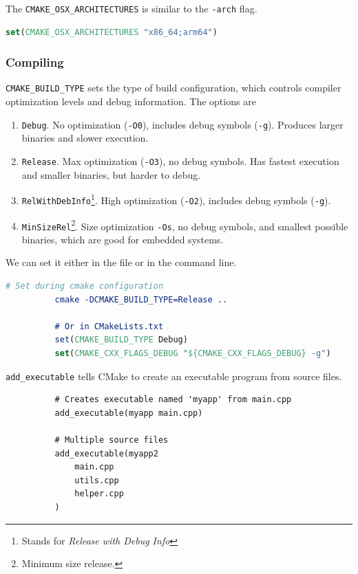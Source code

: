 \documentclass{article}
\newcounter{definition}[section]
\begin{document}
      \begin{definition}[Architecture]
        \label{def:architecture}
        The \texttt{CMAKE\_OSX\_ARCHITECTURES} is similar to the \texttt{-arch} flag. 
        \begin{lstlisting}[language=CMake]
          set(CMAKE_OSX_ARCHITECTURES "x86_64;arm64")
        \end{lstlisting}
      \end{definition} 

    \subsubsection{Compiling}

      \begin{definition}
        \label{def:build-type}
        \texttt{CMAKE\_BUILD\_TYPE} sets the type of build configuration, which controls compiler optimization levels and debug information. The options are 
        \begin{enumerate}
          \item \texttt{Debug}. No optimization (\texttt{-O0}), includes debug symbols (\texttt{-g}). Produces larger binaries and slower execution. 
          \item \texttt{Release}. Max optimization (\texttt{-O3}), no debug symbols. Has fastest execution and smaller binaries, but harder to debug. 
          \item \texttt{RelWithDebInfo}\footnote{Stands for \textit{Release with Debug Info}}. High optimization (\texttt{-O2}), includes debug symbols (\texttt{-g}).  
          \item \texttt{MinSizeRel}\footnote{Minimum size release.}. Size optimization \texttt{-Os}, no debug symbols, and smallest possible binaries, which are good for embedded systems. 
        \end{enumerate}
        We can set it either in the file or in the command line. 
        \begin{lstlisting}[language=CMake]
          # Set during cmake configuration
          cmake -DCMAKE_BUILD_TYPE=Release ..

          # Or in CMakeLists.txt 
          set(CMAKE_BUILD_TYPE Debug)
          set(CMAKE_CXX_FLAGS_DEBUG "${CMAKE_CXX_FLAGS_DEBUG} -g")
        \end{lstlisting}
      \end{definition} 

      \begin{definition}
        \label{def:add-executable}
        \texttt{add\_executable} tells CMake to create an executable program from source files. 
        \begin{lstlisting}
          # Creates executable named 'myapp' from main.cpp
          add_executable(myapp main.cpp)  

          # Multiple source files 
          add_executable(myapp2 
              main.cpp
              utils.cpp
              helper.cpp
          )
        \end{lstlisting}
      \end{definition}
\end{document}
